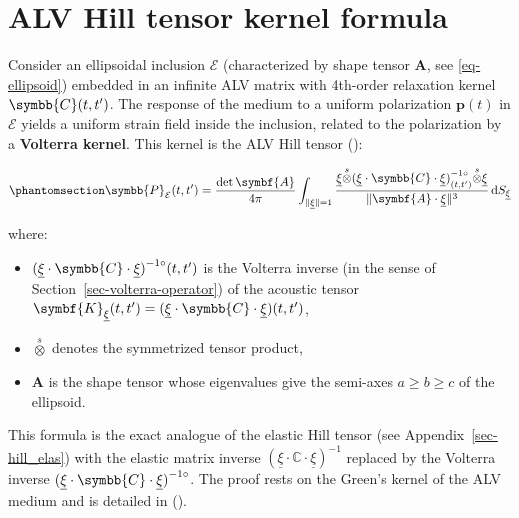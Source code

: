 \documentclass[
  a4paper,
  numbers=noendperiod,
  DIV=12]{scrreprt}
\providecommand{\tightlist}{%
  \setlength{\itemsep}{0pt}\setlength{\parskip}{0pt}}
\newcommand{\uu}[1]{{\symbf{{#1}}}}
\newcommand{\uuuu}[1]{{\symbb{{#1}}}}
\newcommand{\uv}[1]{{\underline{{#1}}}}
\newcommand{\sotimes}{{\stackrel{s}{\otimes}}}
\newcommand{\ud}{{\,\mathrm{d}}}
\newcommand{\volt}[1]{{#1}^{-1\circ}}
\begin{document}
\section{ALV Hill tensor kernel
formula}\label{alv-hill-tensor-kernel-formula}

Consider an ellipsoidal inclusion \(\mathcal{E}\) (characterized by
shape tensor \(\uu{A}\), see \ref{eq-ellipsoid}) embedded in an infinite
ALV matrix with 4th-order relaxation kernel \(\uuuu{C}(t,t')\). The
response of the medium to a uniform polarization \(\uu{p}(t)\) in
\(\mathcal{E}\) yields a uniform strain field inside the inclusion,
related to the polarization by a \textbf{Volterra kernel}. This kernel
is the ALV Hill tensor ():

\begin{equation}\protect\phantomsection\label{eq-alv-hill-kernel}{
\uuuu{P}_\mathcal{E}(t,t') = \frac{\det\uu{A}}{4\pi}
\int_{\|\uv{\xi}\|=1}
\frac{\uv{\xi} \sotimes \volt{(\uv{\xi}\cdot\uuuu{C}\cdot\uv{\xi})}_{(t,t')} \sotimes \uv{\xi}}{\|\uu{A}\cdot\uv{\xi}\|^3}
\ud S_{\uv{\xi}}
}\end{equation}

where:

\begin{itemize}
\tightlist
\item
  \(\volt{(\uv{\xi}\cdot\uuuu{C}\cdot\uv{\xi})}(t,t')\) is the Volterra
  inverse (in the sense of Section~\ref{sec-volterra-operator}) of the
  acoustic tensor
  \(\uu{K}_{\uv{\xi}}(t,t') = (\uv{\xi}\cdot\uuuu{C}\cdot\uv{\xi})(t,t')\),
\item
  \(\sotimes\) denotes the symmetrized tensor product,
\item
  \(\uu{A}\) is the shape tensor whose eigenvalues give the semi-axes
  \(a\geq b\geq c\) of the ellipsoid.
\end{itemize}

This formula is the exact analogue of the elastic Hill tensor (see
Appendix~\ref{sec-hill_elas}) with the elastic matrix inverse
\((\uv{\xi}\cdot\mathbb{C}\cdot\uv{\xi})^{-1}\) replaced by the Volterra
inverse \(\volt{(\uv{\xi}\cdot\uuuu{C}\cdot\uv{\xi})}\). The proof rests
on the Green's kernel of the ALV medium and is detailed in
().
\end{document}
